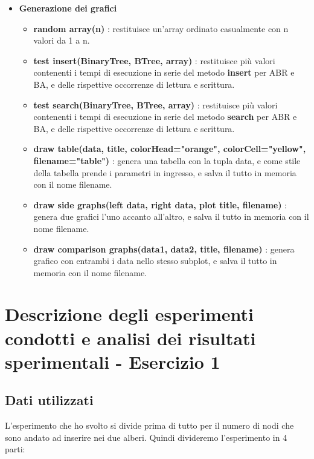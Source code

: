 \begin{itemize}
\begin{itemize}
    \end{itemize}
    
    \item \textbf{Generazione dei grafici}
    \begin{itemize}
    
        \item \textbf{random array(n)} : restituisce un'array ordinato casualmente con n valori da 1 a n.
        
        \item \textbf{test insert(BinaryTree, BTree, array)} : restituisce più valori contenenti i tempi di esecuzione in serie del metodo \textbf{insert} per ABR e BA, e delle rispettive occorrenze di lettura e scrittura. 
        
        \item \textbf{test search(BinaryTree, BTree, array)} : restituisce più valori contenenti i tempi di esecuzione in serie del metodo \textbf{search} per ABR e BA, e delle rispettive occorrenze di lettura e scrittura.
        
        \item \textbf{draw table(data, title, colorHead="orange", colorCell="yellow", filename="table")} : genera una tabella con la tupla data, e come stile della tabella prende i parametri in ingresso, e salva il tutto in memoria con il nome filename.
        
        \item \textbf{draw side graphs(left data, right data, plot title, filename)} : genera due grafici l'uno accanto all'altro, e salva il tutto in memoria con il nome filename.
        
        \item \textbf{draw comparison graphs(data1, data2, title, filename)} : genera grafico con entrambi i data nello stesso subplot, e salva il tutto in memoria con il nome filename.
        
    \end{itemize}
    
\end{itemize}

\newpage
\section{Descrizione degli esperimenti condotti e analisi dei risultati sperimentali - Esercizio 1}

\subsection{Dati utilizzati}
\label{sec:DatiUtilizzati_1}
L'esperimento che ho svolto si divide prima di tutto per il numero di nodi che sono andato ad inserire nei due alberi. Quindi divideremo l'esperimento in 4 parti:

